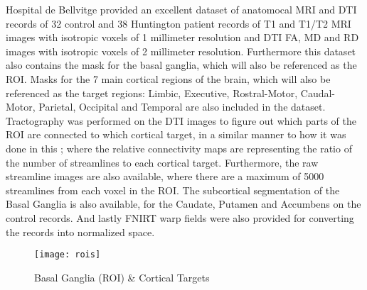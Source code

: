  \par

Hospital de Bellvitge provided an excellent dataset of anatomocal \ac{MRI} and \ac{DTI} records of 32 control and 38 Huntington patient records of T1 and T1/T2 \ac{MRI} images with isotropic voxels of 1 millimeter resolution and \ac{DTI} \ac{FA}, \ac{MD} and \ac{RD} images with isotropic voxels of 2 millimeter resolution. Furthermore this dataset also contains the mask for the basal ganglia, which will also be referenced as the \ac{ROI}. Masks for the 7 main cortical regions of the brain, which will also be referenced as the target regions: Limbic, Executive, Rostral-Motor, Caudal-Motor, Parietal, Occipital and Temporal are also included in the dataset. Tractography was performed on the \ac{DTI} images to figure out which parts of the \ac{ROI} are connected to which cortical target, in a similar manner to how it was done in this ; where the relative connectivity maps are representing the ratio of the number of streamlines to each cortical target. Furthermore, the raw streamline images are also available, where there are a maximum of 5000 streamlines from each voxel in the \ac{ROI}. The subcortical segmentation of the Basal Ganglia is also available, for the Caudate, Putamen and Accumbens on the control records. And lastly \ac{FNIRT} warp fields were also provided for converting the records into normalized space.\par

\begin{figure}[H]
\centering
\texttt{[image: rois]}
\caption{Basal Ganglia (ROI) \& Cortical Targets}
\label{fig:rois}
\end{figure}

